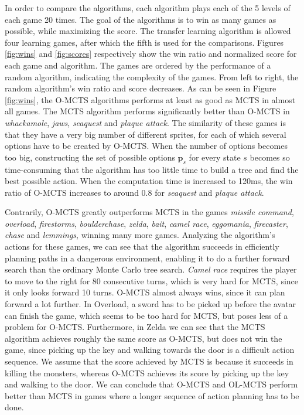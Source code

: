 In order to compare the algorithms, each algorithm plays each of the 5 levels
of each game 20 times. The goal of the algorithms is to win as many games as
possible, while maximizing the score. The transfer learning algorithm is
allowed four learning games, after which the fifth is used for the
comparisons. Figures \ref{fig:wins} and \ref{fig:scores} respectively show the
win ratio and normalized score for each game and algorithm. The games are
ordered by the performance of a random algorithm, indicating the complexity of
the games. From left to right, the random algorithm's win ratio and score
decreases. As can be seen in Figure \ref{fig:wins}, the O-MCTS algorithms
performs at least as good as MCTS in almost all games. The MCTS algorithm
performs significantly better than O-MCTS in \textit{whackamole}, \textit{jaws},
\textit{seaquest} and \textit{plaque attack}. The similarity of these games is
that they have a very big number of different sprites, for each of which several
options have to be created by O-MCTS.  When the number of options becomes too
big, constructing the set of possible options $\mathbf{p}_s$ for every state $s$
becomes so time-consuming that the algorithm has too little time to build a tree
and find the best possible action. When the computation time is increased to
120ms, the win ratio of O-MCTS increases to around $0.8$ for \textit{seaquest}
and \textit{plaque attack}.

Contrarily, O-MCTS greatly outperforms MCTS in the games \textit{missile
command}, \textit{overload}, \textit{firestorms}, \textit{boulderchase},
\textit{zelda}, \textit{bait}, \textit{camel race}, \textit{eggomania},
\textit{firecaster}, \textit{chase} and \textit{lemmings}, winning many more
games. Analyzing the algorithm's actions for these games, we can see that
the algorithm succeeds in efficiently planning paths in a dangerous environment,
enabling it to do a further forward search than the ordinary Monte Carlo tree
search. \textit{Camel race} requires the player to move to the right for 80
consecutive turns, which is very hard for MCTS, since it only looks forward 10 
turns. O-MCTS almost always wins, since it can plan forward a lot further. In
Overload, a sword has to be picked up before the avatar can finish the game,
which seems to be too hard for MCTS, but poses less of a problem for O-MCTS.
Furthermore, in Zelda we can see that the MCTS algorithm achieves roughly the
same score as O-MCTS, but does not win the game, since picking up the key and
walking towards the door is a difficult action sequence. We assume that the
score achieved by MCTS is because it succeeds in killing the monsters, whereas
O-MCTS achieves its score by picking up the key and walking to the door. We can
conclude that O-MCTS and OL-MCTS perform better than MCTS in games where a
longer sequence of action planning has to be done.

